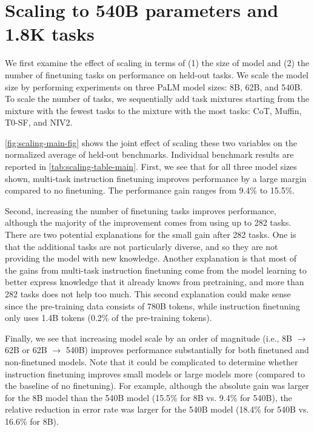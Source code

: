 \section{Scaling to 540B parameters and 1.8K tasks}\label{sec:scaling}

We first examine the effect of scaling in terms of (1) the size of model and (2) the number of finetuning tasks on performance on held-out tasks. We scale the model size by performing experiments on three PaLM model sizes: 8B, 62B, and 540B. To scale the number of tasks, we sequentially add task mixtures starting from the mixture with the fewest tasks to the mixture with the most tasks: CoT, Muffin, T0-SF, and NIV2.

\ref{fig:scaling-main-fig} shows the joint effect of scaling these two variables on the normalized average of held-out benchmarks. Individual benchmark results are reported in \ref{tab:scaling-table-main}.
First, we see that for all three model sizes shown, multi-task instruction finetuning improves performance by a large margin compared to no finetuning. The performance gain ranges from 9.4\% to 15.5\%.

Second, increasing the number of finetuning tasks improves performance, although the majority of the improvement comes from using up to 282 tasks. There are two potential explanations for the small gain after 282 tasks. One is that the additional tasks are not particularly diverse, and so they are not providing the model with new knowledge. Another explanation is that most of the gains from multi-task instruction finetuning come from the model learning to better express knowledge that it already knows from pretraining, and more than 282 tasks does not help too much. This second explanation could make sense since the pre-training data consists of 780B tokens, while instruction finetuning only uses 1.4B tokens (0.2\% of the pre-training tokens).

Finally, we see that increasing model scale by an order of magnitude (i.e., 8B $\rightarrow$ 62B or 62B $\rightarrow$ 540B) improves performance substantially for both finetuned and non-finetuned models. Note that it could be complicated to determine whether instruction finetuning improves small models or large models more (compared to the baseline of no finetuning). For example, although the absolute gain was larger for the 8B model than the 540B model (15.5\% for 8B vs. 9.4\% for 540B), the relative reduction in error rate was larger for the 540B model (18.4\% for 540B vs. 16.6\% for 8B).

